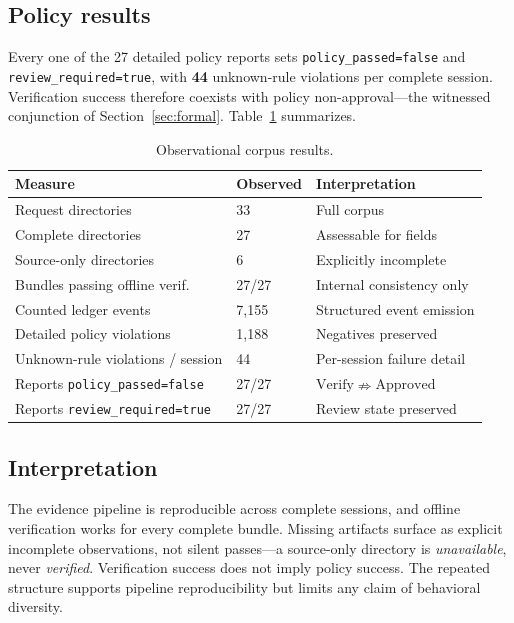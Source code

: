 \documentclass[conference]{IEEEtran}
\newcommand{\code}[1]{\texttt{\small #1}}
\begin{document}
\subsection{Policy results}
Every one of the 27 detailed policy reports sets \code{policy\_passed=false} and
\code{review\_required=true}, with \textbf{44} unknown-rule violations per complete
session. Verification success therefore coexists with policy non-approval---the witnessed
conjunction of Section~\ref{sec:formal}. Table~\ref{tab:corpus} summarizes.

\begin{table}[t]
\centering
\caption{Observational corpus results.}
\label{tab:corpus}
\renewcommand{\arraystretch}{1.2}
\footnotesize
\begin{tabular}{@{}p{}p{}p{}@{}}
\toprule
\textbf{Measure} & \textbf{Observed} & \textbf{Interpretation} \\
\midrule
Request directories & 33 & Full corpus \\
Complete directories & 27 & Assessable for fields \\
Source-only directories & 6 & Explicitly incomplete \\
Bundles passing offline verif.\ & 27/27 & Internal consistency only \\
Counted ledger events & 7{,}155 & Structured event emission \\
Detailed policy violations & 1{,}188 & Negatives preserved \\
Unknown-rule violations / session & 44 & Per-session failure detail \\
Reports \code{policy\_passed=false} & 27/27 & $\mathrm{Verify}\nRightarrow\mathrm{Approved}$ \\
Reports \code{review\_required=true} & 27/27 & Review state preserved \\
\bottomrule
\end{tabular}
\end{table}

\subsection{Interpretation}
The evidence pipeline is reproducible across complete sessions, and offline verification
works for every complete bundle. Missing artifacts surface as explicit incomplete
observations, not silent passes---a source-only directory is \emph{unavailable}, never
\emph{verified}. Verification success does not imply policy success. The repeated
structure supports pipeline reproducibility but limits any claim of behavioral diversity.
\end{document}
